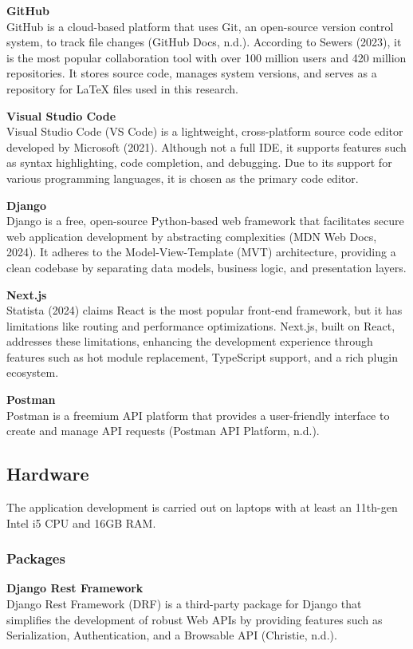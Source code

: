 \textbf{GitHub} \\
GitHub is a cloud-based platform that uses Git, an open-source version control system, to track file changes (GitHub Docs, n.d.). According to Sewers (2023), it is the most popular collaboration tool with over 100 million users and 420 million repositories. It stores source code, manages system versions, and serves as a repository for LaTeX files used in this research.

\textbf{Visual Studio Code} \\
Visual Studio Code (VS Code) is a lightweight, cross-platform source code editor developed by Microsoft (2021). Although not a full IDE, it supports features such as syntax highlighting, code completion, and debugging. Due to its support for various programming languages, it is chosen as the primary code editor.

\textbf{Django} \\
Django is a free, open-source Python-based web framework that facilitates secure web application development by abstracting complexities (MDN Web Docs, 2024). It adheres to the Model-View-Template (MVT) architecture, providing a clean codebase by separating data models, business logic, and presentation layers.

\textbf{Next.js} \\
Statista (2024) claims React is the most popular front-end framework, but it has limitations like routing and performance optimizations. Next.js, built on React, addresses these limitations, enhancing the development experience through features such as hot module replacement, TypeScript support, and a rich plugin ecosystem.

\textbf{Postman} \\
Postman is a freemium API platform that provides a user-friendly interface to create and manage API requests (Postman API Platform, n.d.).

\subsection{Hardware}
The application development is carried out on laptops with at least an 11th-gen Intel i5 CPU and 16GB RAM.

\subsubsection{Packages}
\textbf{Django Rest Framework} \\
Django Rest Framework (DRF) is a third-party package for Django that simplifies the development of robust Web APIs by providing features such as Serialization, Authentication, and a Browsable API (Christie, n.d.).

